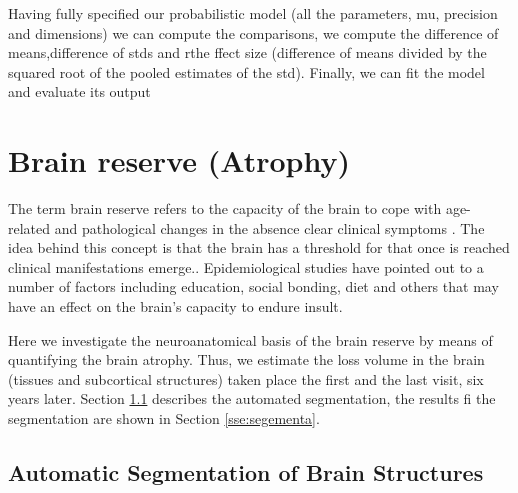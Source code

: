 \documentclass[11pt]{article}
\theoremstyle{definition}
\theoremstyle{remark}
\begin{document}
Having fully specified our probabilistic model (all the parameters, mu, precision and dimensions) we can compute the comparisons, we compute the difference of means,difference of stds and rthe ffect size (difference of means divided by the squared root of the pooled estimates of the std).
Finally, we can fit the model and evaluate its output

\section{Brain reserve (Atrophy)}
\label{se:atro}
The term brain reserve refers to the capacity of the brain to cope with age-related and pathological changes in the absence clear clinical symptoms \cite{fratiglioni2007brain}. The idea behind this concept is that the brain has a threshold for that once is reached clinical manifestations emerge.. Epidemiological studies have pointed out to 
a number of factors including education, social bonding, diet and others that may have an effect on the brain's capacity to endure insult.

Here we investigate the neuroanatomical basis of the brain reserve by means of quantifying the brain atrophy. Thus, we estimate the loss volume in the brain (tissues and subcortical structures) taken place the first and the last visit, six years later. Section \ref{sse:mri} describes the automated segmentation, the results fi the segmentation are shown in Section \ref{sse:segementa}.   


\subsection{Automatic Segmentation of Brain Structures}
\label{sse:mri}
\end{document}
